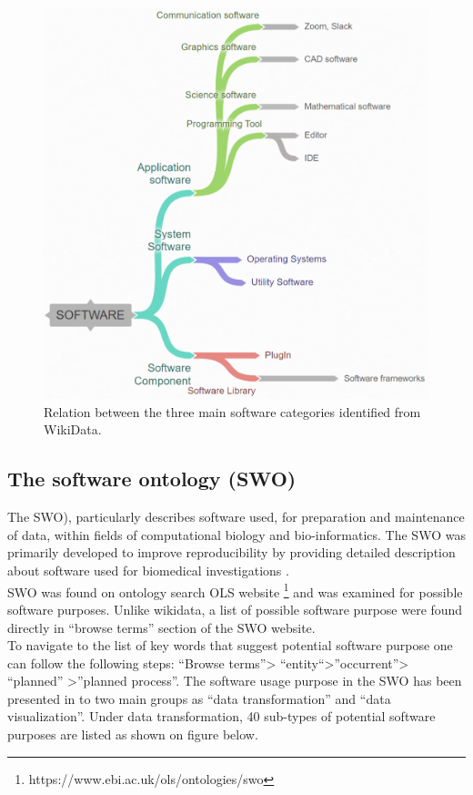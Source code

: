 \begin{figure}[htbp]
	\centering
	\includegraphics[width=.73\textwidth]{4.graphics/figures/chart}
	\caption{Relation between the three main software categories identified from WikiData.}
	\label{fig:chapter03:setup}
\end{figure}


\subsection{The software ontology (SWO)}
\label{subsec:purpose:ontologies:SWO}

The \ac{SWO}), particularly describes software used, for preparation and maintenance of data, within fields of computational biology and bio-informatics.  The \ac{SWO} was primarily developed to improve reproducibility by providing detailed description about software used for biomedical investigations \citep{malone2014software}. \\

\ac{SWO} was found on ontology search \ac{OLS} website \footnote{https://www.ebi.ac.uk/ols/ontologies/swo} and was examined for possible software purposes. Unlike wikidata, a list of possible software purpose were found directly in “browse terms” section of the SWO website.  \\

To navigate to the list of key words that suggest potential software purpose one can follow the following steps: “Browse terms”> “entity“>”occurrent”> “planned” >”planned process”.  The software usage purpose in the SWO has been presented in to two main groups as “data transformation” and “data visualization”.  Under data transformation, 40 sub-types of potential software purposes are listed as shown on figure below. \\


